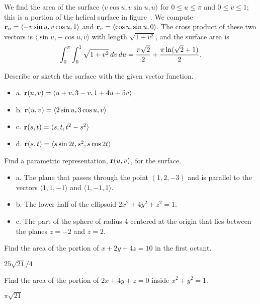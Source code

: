 \begin{example} We find the area of the surface $\langle v\cos u,v\sin
u,u\rangle$ for $0\le u \le \pi$ and  $0\le v\le 1$; this is a portion
of the helical surface in figure~.
We compute ${\bf r}_u = \langle -v\sin u,v\cos u,1\rangle$
and ${\bf r}_v = \langle \cos u,\sin u,0\rangle$.
The cross product of these two vectors is $\langle \sin u,-\cos
u,v\rangle$ with length $\sqrt{1+v^2}$, and the surface area is
$$\int_0^\pi\int_0^1 \sqrt{1+v^2}\,dv\,du={\pi\sqrt2\over2}+
{\pi\ln(\sqrt2+1)\over 2}.$$
\end{example}

\begin{exercises}

\exercise Describe or sketch the surface with the given vector function.
\begin{itemize} %

  \item{a.} ${\bf r}(u,v) = \langle u+v,3-v,1+4u+5v\rangle$
  \item{b.} ${\bf r}(u,v) = \langle 2\sin u, 3\cos u, v\rangle$ 
  \item{c.} ${\bf r}(s,t) = \langle s,t,t^2-s^2\rangle$
  \item{d.} ${\bf r}(s,t) = \langle s\sin 2t, s^2, s\cos 2t\rangle$

\end{itemize}

\exercise Find a parametric representation, ${\bf r}(u,v)$, for the surface.
\begin{itemize} %
  \item{a.} The plane that passes through the point $(1,2,-3)$ and is parallel
  to the vectors $\langle 1,1,-1\rangle$ and $\langle 1,-1,1\rangle$.

  \item{b.} The lower half of the ellipsoid $2x^2+4y^2+z^2=1$.

  \item{c.} The part of the sphere of radius 4 centered at the origin that lies
  between the planes $z=-2$ and $z=2$.
\end{itemize}

\exercise Find the area of the portion of $x+2y+4z=10$ in the first
octant.
\begin{answer} $25\sqrt{21}/4$
\end{answer}

\exercise Find the area of the portion of $2x+4y+z=0$
inside $x^2+y^2=1$.
\begin{answer} $\pi\sqrt{21}$
\end{answer}


\end{exercises}
